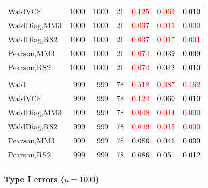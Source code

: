 \documentclass[
]{article}
\begin{document}
\begin{table}[H]
{\begin{tabular}[t]{lrrrrrr}
\hspace{1em}WaldVCF & 1000 & 1000 & 21 & \textcolor{red}{0.125} & \textcolor{red}{0.069} & \textcolor{black}{0.010}\\
\hspace{1em}WaldDiag,MM3 & 1000 & 1000 & 21 & \textcolor{red}{0.037} & \textcolor{red}{0.015} & \textcolor{red}{0.000}\\
\hspace{1em}WaldDiag,RS2 & 1000 & 1000 & 21 & \textcolor{red}{0.037} & \textcolor{red}{0.017} & \textcolor{red}{0.001}\\
\hspace{1em}Pearson,MM3 & 1000 & 1000 & 21 & \textcolor{red}{0.074} & \textcolor{black}{0.039} & \textcolor{black}{0.009}\\
\hspace{1em}Pearson,RS2 & 1000 & 1000 & 21 & \textcolor{red}{0.074} & \textcolor{black}{0.042} & \textcolor{black}{0.010}\\
\addlinespace[0.3em]
\multicolumn{7}{l}{\textbf{3F 15V}}\\
\hspace{1em}Wald & 999 & 999 & 78 & \textcolor{red}{0.518} & \textcolor{red}{0.387} & \textcolor{red}{0.162}\\
\hspace{1em}WaldVCF & 999 & 999 & 78 & \textcolor{red}{0.124} & \textcolor{black}{0.060} & \textcolor{black}{0.010}\\
\hspace{1em}WaldDiag,MM3 & 999 & 999 & 78 & \textcolor{red}{0.048} & \textcolor{red}{0.014} & \textcolor{red}{0.000}\\
\hspace{1em}WaldDiag,RS2 & 999 & 999 & 78 & \textcolor{red}{0.049} & \textcolor{red}{0.015} & \textcolor{red}{0.000}\\
\hspace{1em}Pearson,MM3 & 999 & 999 & 78 & \textcolor{black}{0.086} & \textcolor{black}{0.046} & \textcolor{black}{0.009}\\
\hspace{1em}Pearson,RS2 & 999 & 999 & 78 & \textcolor{black}{0.086} & \textcolor{black}{0.051} & \textcolor{black}{0.012}\\
\bottomrule
\end{tabular}}
\endgroup{}
\end{table}

\hypertarget{type-i-errors-n1000-2}{%
\subsubsection{\texorpdfstring{Type I errors
(\(n=1000\))}{Type I errors (n=1000)}}\label{type-i-errors-n1000-2}}
\end{document}
